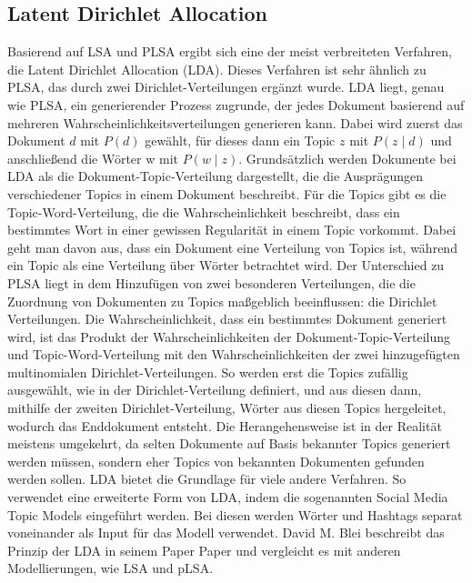 \documentclass[german,version-2020-11]{uzl-thesis}
\begin{document}
\subsection{Latent Dirichlet Allocation}
Basierend auf LSA und PLSA ergibt sich eine der meist verbreiteten Verfahren, die Latent Dirichlet Allocation (LDA). Dieses Verfahren ist sehr ähnlich zu PLSA, das durch zwei Dirichlet-Verteilungen ergänzt wurde. LDA liegt, genau wie PLSA, ein generierender Prozess zugrunde, der jedes Dokument basierend auf mehreren Wahrscheinlichkeitsverteilungen generieren kann. Dabei wird zuerst das Dokument $d$ mit $P(d)$ gewählt, für dieses dann ein Topic $z$ mit $P(z \mid d)$ und anschließend die Wörter w mit $P(w \mid z)$. Grundsätzlich werden Dokumente bei LDA als die Dokument-Topic-Verteilung dargestellt, die die Ausprägungen verschiedener Topics in einem Dokument beschreibt. Für die Topics gibt es die Topic-Word-Verteilung, die die Wahrscheinlichkeit beschreibt, dass ein bestimmtes Wort in einer gewissen Regularität in einem Topic vorkommt. Dabei geht man davon aus, dass ein Dokument eine Verteilung von Topics ist, während ein Topic als eine Verteilung über Wörter betrachtet wird. Der Unterschied zu PLSA liegt in dem Hinzufügen von zwei besonderen Verteilungen, die die Zuordnung von Dokumenten zu Topics maßgeblich beeinflussen: die Dirichlet Verteilungen.
Die Wahrscheinlichkeit, dass ein bestimmtes Dokument generiert wird, ist das Produkt der Wahrscheinlichkeiten der Dokument-Topic-Verteilung und Topic-Word-Verteilung mit den Wahrscheinlichkeiten der zwei hinzugefügten multinomialen Dirichlet-Verteilungen. So werden erst die Topics zufällig ausgewählt, wie in der Dirichlet-Verteilung definiert, und aus diesen dann, mithilfe der zweiten Dirichlet-Verteilung, Wörter aus diesen Topics hergeleitet, wodurch das Enddokument entsteht. Die Herangehensweise ist in der Realität meistens umgekehrt, da selten Dokumente auf Basis bekannter Topics generiert werden müssen, sondern eher Topics von bekannten Dokumenten gefunden werden sollen. LDA bietet die Grundlage für viele andere Verfahren. So verwendet \cite{t0} eine erweiterte Form von LDA, indem die sogenannten Social Media Topic Models eingeführt werden. Bei diesen werden Wörter und Hashtags separat voneinander als Input für das Modell verwendet. David M. Blei beschreibt das Prinzip der LDA in seinem Paper Paper \cite{lda} und vergleicht es mit anderen Modellierungen, wie LSA und pLSA. 
\end{document}
